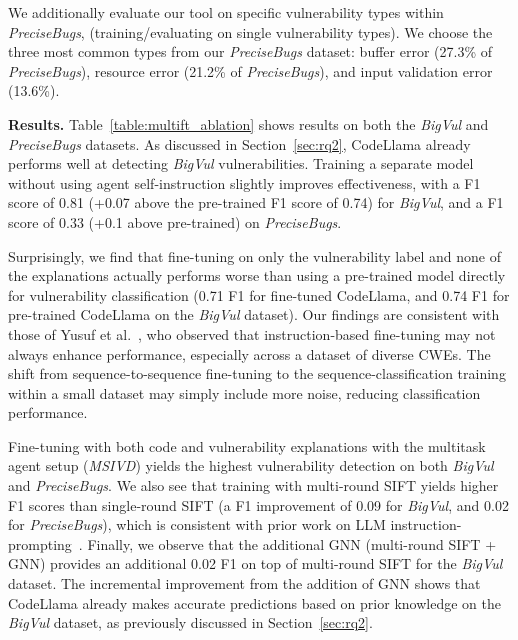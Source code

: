 \documentclass[12pt,openany,oneside,table]{cmuthesis}
\begin{document}
We additionally evaluate our tool on specific vulnerability types within \textit{PreciseBugs}, (training/evaluating on single vulnerability types). We choose the three most common types from our \textit{PreciseBugs} dataset: buffer error (27.3\% of \textit{PreciseBugs}), resource error (21.2\% of \textit{PreciseBugs}), and input validation error (13.6\%). 

\noindent\textbf{Results.} Table~\ref{table:multift_ablation} shows results on both the \textit{BigVul} and \textit{PreciseBugs} datasets. As discussed in Section~\ref{sec:rq2}, CodeLlama already performs well at detecting \textit{BigVul} vulnerabilities. Training a separate model without using agent self-instruction slightly improves effectiveness, with a F1 score of 0.81 (+0.07 above the pre-trained F1 score of 0.74) for \textit{BigVul}, and a F1 score of 0.33 (+0.1 above pre-trained) on \textit{PreciseBugs}.

Surprisingly, we find that fine-tuning on only the vulnerability label and none of the explanations actually performs worse than using a pre-trained model directly for vulnerability classification (0.71 F1 for fine-tuned CodeLlama, and 0.74 F1 for pre-trained CodeLlama on the \textit{BigVul} dataset). 
Our findings are consistent with those of Yusuf et al.~\cite{instruct_vul}, who observed that instruction-based fine-tuning may not always enhance performance, especially across a dataset of diverse CWEs. The shift from sequence-to-sequence fine-tuning to the sequence-classification training within a small dataset may simply include more noise, reducing classification performance.

Fine-tuning with both code and vulnerability explanations with the multitask agent setup (\textit{MSIVD}) yields the highest vulnerability detection on both \textit{BigVul} and \textit{PreciseBugs}. 
We also see that training with multi-round SIFT yields higher F1 scores than single-round SIFT (a F1 improvement of 0.09 for \textit{BigVul}, and 0.02 for \textit{PreciseBugs}), which is consistent with prior work on LLM instruction-prompting~\cite{zero-shot}. Finally, we observe that the additional GNN (multi-round SIFT + GNN) provides an additional 0.02 F1 on top of multi-round SIFT for the \textit{BigVul} dataset. The incremental improvement from the addition of GNN shows that CodeLlama already makes accurate predictions based on prior knowledge on the \textit{BigVul} dataset, as previously discussed in Section~\ref{sec:rq2}.
\end{document}
